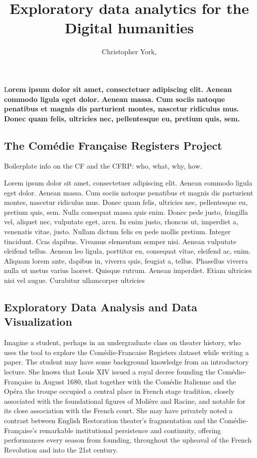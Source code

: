 \documentclass[	DIV=calc,%
							paper=a4,%
							fontsize=11pt,%
							twocolumn]{scrartcl}	 					%
\title{Exploratory data analytics for the Digital humanities}					%
\author{Christopher York, }										%
\date{}																				%
\newcommand{\initial}[1]{%
     \lettrine[lines=3,lhang=0.3,nindent=0em]{
     				\color{DarkGoldenrod}
     				{\textsf{#1}}}{}}
\begin{document}
\maketitle
\thispagestyle{fancy} 			%
\initial{L}\textbf{orem ipsum dolor sit amet, consectetuer adipiscing elit. Aenean commodo ligula eget dolor. Aenean massa. Cum sociis natoque penatibus et magnis dis parturient montes, nascetur ridiculus mus. Donec quam felis, ultricies nec, pellentesque eu, pretium quis, sem.}

\subsection*{The Comédie Française Registers Project}
Boilerplate info on the CF and the CFRP: who, what, why, how.

Lorem ipsum dolor sit amet, consectetuer adipiscing elit. Aenean commodo ligula eget dolor. Aenean massa. Cum sociis natoque penatibus et magnis dis parturient montes, nascetur ridiculus mus. Donec quam felis, ultricies nec, pellentesque eu, pretium quis, sem. Nulla consequat massa quis enim. Donec pede justo, fringilla vel, aliquet nec, vulputate eget, arcu. In enim justo, rhoncus ut, imperdiet a, venenatis vitae, justo. Nullam dictum felis eu pede mollis pretium. Integer tincidunt. Cras dapibus. Vivamus elementum semper nisi. Aenean vulputate eleifend tellus. Aenean leo ligula, porttitor eu, consequat vitae, eleifend ac, enim. Aliquam lorem ante, dapibus in, viverra quis, feugiat a, tellus. Phasellus viverra nulla ut metus varius laoreet. Quisque rutrum. Aenean imperdiet. Etiam ultricies nisi vel augue. Curabitur ullamcorper ultricies


\subsection*{Exploratory Data Analysis and Data Visualization}

Imagine a student, perhaps in an undergraduate class on theater history, who uses the tool to explore the Comédie-Francaise Registers dataset while writing a paper. The student may have some background knowledge from an introductory lecture.  She knows that Louis XIV issued a royal decree founding the Comédie-Française in August 1680, that together with the Comédie Italienne and the Opéra the troupe occupied a central place in French stage tradition, closely associated with the foundational figures of Molière and Racine, and notable for its close association with the French court.  She may have privately noted a contrast between English Restoration theater’s fragmentation and the Comédie-Française’s remarkable institutional persistence and continuity, offering performances every season from founding, throughout the upheaval of the French Revolution and into the 21st century.
\end{document}
